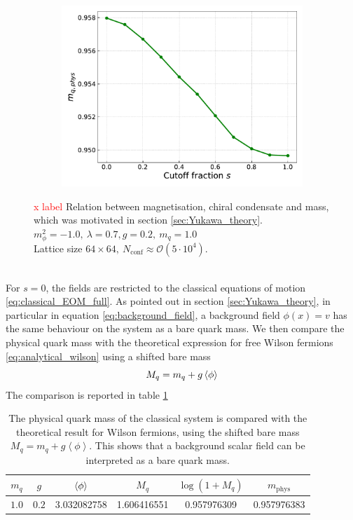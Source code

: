 \begin{figure}[htp]
\begin{subfigure}[b]{0.48\textwidth}
        \includegraphics[width=1.0\textwidth]{figures/slide_broken/mass.pdf}
    \end{subfigure}
    \caption[Relation between magnetisation, condensate and mass]{\textcolor{red}{x label} Relation between magnetisation, chiral condensate and mass, which was motivated in section \ref{sec:Yukawa_theory}. \\ $m_\phi^2=-1.0, \ \lambda=0.7, g=0.2, \ m_q = 1.0$ \\ Lattice size $64 \times 64, \ N_\text{conf} \approx \mathcal{O}(5 \cdot 10^4)$.}
    \label{fig:interpolation_relation_phi_cond_mass}
\end{figure} \\
For $s=0$, the fields are restricted to the classical equations of motion \eqref{eq:classical_EOM_full}. As pointed out in section \ref{sec:Yukawa_theory}, in particular in equation \eqref{eq:background_field}, a background field $\phi(x) = v$ has the same behaviour on the system as a bare quark mass. We then compare the physical quark mass with the theoretical expression for free Wilson fermions \eqref{eq:analytical_wilson} using a shifted bare mass 
\begin{equation*}
	M_q = m_q + g \left\langle \phi \right\rangle
\end{equation*}
The comparison is reported in table \ref{tab:background_field}
\begin{table}[htp]
    \centering
    \begin{tabular}{cccccc}
        \toprule
        $m_q$ & $g$ & $\left\langle \phi \right\rangle$ & $M_q$ & $\log(1+M_q)$ & $m_\text{phys}$ \\
        \midrule
	$1.0$ & $0.2$ & 3.032082758 & 1.606416551
    & 0.957976309
    & 0.957976383 \\
        \bottomrule
    \end{tabular}
    \caption[Background field and quark mass]{The physical quark mass of the classical system is compared with the theoretical result for Wilson fermions, using the shifted bare mass $M_q = m_q + g \left\langle\phi\right\rangle$. This shows that a background scalar field can be interpreted as a bare quark mass.}
    \label{tab:background_field}
\end{table}

